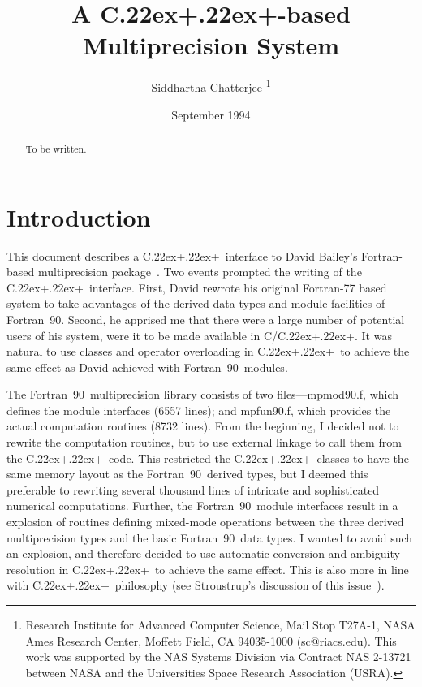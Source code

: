 
\def\Fninety{Fortran~90}
\def\CC{C\raise.22ex\hbox{{\footnotesize +}}\raise.22ex\hbox{\footnotesize +}}
\def\mp{\verb|mp|}

\title{A \CC-based Multiprecision System}

\author{Siddhartha Chatterjee
        \thanks{Research Institute for Advanced Computer Science, 
	        Mail Stop T27A-1, 
		NASA Ames Research Center, 
		Moffett Field, CA 94035-1000 (sc@riacs.edu).
		This work was supported by the NAS Systems Division
		via Contract NAS 2-13721 between NASA and the
		Universities Space Research Association (USRA).}
	}

\date{September 1994}



\maketitle

\begin{abstract}
To be written.
\end{abstract}

\section{Introduction}

This document describes a \CC\ interface to David Bailey's
Fortran-based multiprecision
package~\cite{bailey:90,bailey:93,bailey:94}.
Two events prompted the writing of the \CC\ interface.
First,
David rewrote his original Fortran-77 based system to take advantages
of the derived data types and module facilities of \Fninety.
Second,
he apprised me that there were a large number of potential users of
his system,
were it to be made available in C/\CC.
It was natural to use classes and operator overloading in \CC\ to
achieve the same effect as David achieved with \Fninety\ modules.

The \Fninety\ multiprecision library consists of two
files---mpmod90.f, which defines the module interfaces (6557 lines);
and mpfun90.f, which provides the actual computation routines (8732
lines).
From the beginning,
I decided not to rewrite the computation routines,
but to use external linkage to call them from the \CC\ code.
This restricted the \CC\ classes to have the same memory layout as the
\Fninety\ derived types,
but I deemed this preferable to rewriting several thousand lines of
intricate and sophisticated numerical computations.
Further,
the \Fninety\ module interfaces result in a explosion of routines
defining mixed-mode operations between the three derived
multiprecision types and the basic \Fninety\ data types.
I wanted to avoid such an explosion,
and therefore decided to use automatic conversion and ambiguity
resolution in \CC\ to achieve the same effect.
This is also more in line with \CC\ philosophy
(see Stroustrup's discussion of this
issue~\cite[p.~80]{stroustrup:94}).

